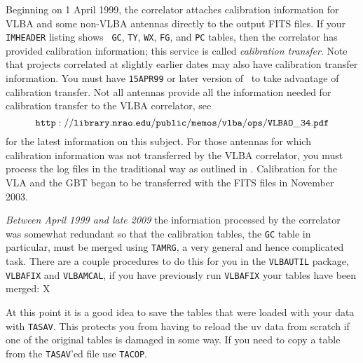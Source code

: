 Beginning on 1 April 1999, the  correlator attaches
calibration information for VLBA and some non-VLBA antennas directly
to the output FITS files.  If your {\tt IMHEADER} listing shows {\tt
GC}, {\tt TY}, {\tt WX}, {\tt FG}, and {\tt PC} tables, then the
correlator has provided calibration information; this service is
called {\it calibration transfer\/}.  Note that projects correlated at
slightly earlier dates may also have calibration transfer information.
You must have {\tt 15APR99} or later version of \AIPS\ to take
advantage of calibration transfer. Not all antennas provide all the
information needed for calibration transfer to the VLBA correlator,
see $${\tt
http://library.nrao.edu/public/memos/vlba/ops/VLBAO\_34.pdf}$$
for the latest information on this subject.  For those antennas for
which calibration information was not transferred by the VLBA
correlator, you must process the log files in the traditional way as
outlined in .  Calibration for the VLA and the GBT began
to be transferred with the FITS files in November 2003.

{\it Between April 1999 and late 2009} the information processed by the
correlator was somewhat redundant so
that the calibration tables, the {\tt GC} table in particular, must be
merged using {\tt TAMRG}, a  very general and hence complicated task.
There are a couple procedures to do this for you
in the {\tt VLBAUTIL} package, {\tt VLBAFIX} and {\tt VLBAMCAL}, if you
have previously run {\tt VLBAFIX} your tables have been merged:
X

At this point it is a good idea to save the tables that were loaded with
your data with {\tt TASAV}.  This protects you from having to reload
the uv data from scratch if one of the original tables is damaged in some
way.  If you need to copy a table from the {\tt TASAV}'ed file use
{\tt TACOP}.



